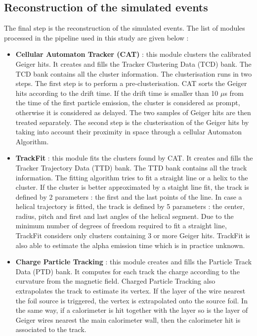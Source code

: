 \documentclass[main.tex]{subfiles}
\begin{document}
\FloatBarrier


\subsection{Reconstruction of the simulated events}\label{sec:ReconstructionBi214}


\noindent The final step is the reconstruction of the simulated events. The list of modules processed in the pipeline used in this study are given below : 


\begin{itemize}


\item \textbf{Cellular Automaton Tracker (CAT)} : this module clusters the calibrated Geiger hits. It creates and fills the Tracker Clustering Data (TCD) bank. The TCD bank contains all the cluster information. The clusterisation runs in two steps. The first step is to perform a pre-clusterisation. CAT sorts the Geiger hits according to the drift time. If the drift time is smaller than 10 $\mu$s from the time of the first particle emission, the cluster is considered as prompt, otherwise it is considered as delayed. The two samples of Geiger hits are then treated separately. The second step is the clusterisation of the Geiger hits by taking into  account their proximity in space through a cellular Automaton Algorithm. %

\item \textbf{TrackFit} : this module fits the clusters found by CAT. It creates and fills the Tracker Trajectory Data (TTD) bank. The TTD bank contains all the track information. The fitting algorithm tries to fit a straight line or a helix to the cluster. If the cluster is better approximated by a staight line fit, the track is defined by 2 parameters : the first and the last points of the line. In case a helical trajectory is fitted, the track is defined by 5 parameters : the center, radius, pitch and first and last angles of the helical segment. Due to the minimum number of degrees of freedom required to fit a straight line, TrackFit considers only clusters containing 3 or more Geiger hits. TrackFit is also able to estimate the alpha emission time which is in practice unknown. %

\item \textbf{Charge Particle Tracking} : this module creates and fills the Particle Track Data (PTD) bank. It computes for each track the charge according to the curvature from the magnetic field.  Charged Particle Tracking also extrapolates the track to estimate its vertex. If the layer of the wire nearest the foil source is triggered, the vertex is extrapolated onto the source foil. In the same way, if a calorimeter is hit together with the layer so is the layer of Geiger wires nearest the main calorimeter wall, then the calorimeter hit is associated to the track. %
\end{itemize}
\end{document}
